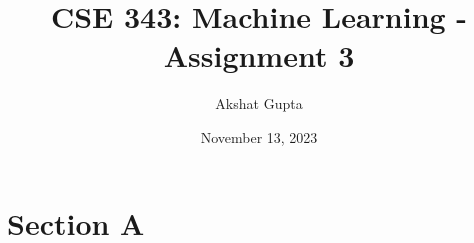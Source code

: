 \documentclass[14pt,a4paper]{article}
\title{\textbf{CSE 343: Machine Learning - Assignment 3}}
\author{Akshat Gupta}
\date{November 13, 2023}
\begin{document}
\maketitle

\section*{Section A}
\end{document}
